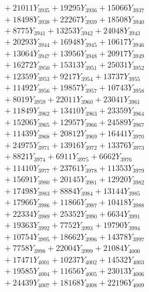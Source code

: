 \documentclass[a4paper,10pt]{article}
\begin{document}
{\begin{align}
&\;  + 21011 Y_{3935} + 19295 Y_{3936} + 15066 Y_{3937} \\[0.3ex]
&\;  + 18498 Y_{3938} + 22267 Y_{3939} + 18508 Y_{3940} \\[0.3ex]
&\;  + 8775 Y_{3941} + 13253 Y_{3942} + 24048 Y_{3943} \\[0.3ex]
&\;  + 20293 Y_{3944} + 16948 Y_{3945} + 10617 Y_{3946} \\[0.3ex]
&\;  + 13064 Y_{3947} + 13956 Y_{3948} + 20917 Y_{3949} \\[0.3ex]
&\;  + 16272 Y_{3950} + 15313 Y_{3951} + 25031 Y_{3952} \\[0.3ex]
&\;  + 12359 Y_{3953} + 9217 Y_{3954} + 13737 Y_{3955} \\[0.3ex]
&\;  + 11492 Y_{3956} + 19857 Y_{3957} + 10743 Y_{3958} \\[0.5ex]\allowbreak
&\;  + 8019 Y_{3959} + 22011 Y_{3960} + 23041 Y_{3961} \\[0.3ex]
&\;  + 11849 Y_{3962} + 13410 Y_{3963} + 23359 Y_{3964} \\[0.3ex]
&\;  + 15206 Y_{3965} + 12957 Y_{3966} + 24589 Y_{3967} \\[0.3ex]
&\;  + 11439 Y_{3968} + 20812 Y_{3969} + 16441 Y_{3970} \\[0.3ex]
&\;  + 24975 Y_{3971} + 13916 Y_{3972} + 13376 Y_{3973} \\[0.3ex]
&\;  + 8821 Y_{3974} + 6911 Y_{3975} + 6662 Y_{3976} \\[0.3ex]
&\;  + 11410 Y_{3977} + 23761 Y_{3978} + 11353 Y_{3979} \\[0.3ex]
&\;  + 15691 Y_{3980} + 20145 Y_{3981} + 12920 Y_{3982} \\[0.3ex]
&\;  + 17498 Y_{3983} + 8884 Y_{3984} + 13144 Y_{3985} \\[0.3ex]
&\;  + 17966 Y_{3986} + 11866 Y_{3987} + 10418 Y_{3988} \\[0.5ex]\allowbreak
&\;  + 22334 Y_{3989} + 25352 Y_{3990} + 6634 Y_{3991} \\[0.3ex]
&\;  + 19363 Y_{3992} + 7752 Y_{3993} + 19790 Y_{3994} \\[0.3ex]
&\;  + 10754 Y_{3995} + 18662 Y_{3996} + 14378 Y_{3997} \\[0.3ex]
&\;  + 7758 Y_{3998} + 22004 Y_{3999} + 21084 Y_{4000} \\[0.3ex]
&\;  + 17471 Y_{4001} + 10237 Y_{4002} + 14532 Y_{4003} \\[0.3ex]
&\;  + 19585 Y_{4004} + 11656 Y_{4005} + 23013 Y_{4006} \\[0.3ex]
&\;  + 24439 Y_{4007} + 18168 Y_{4008} + 22196 Y_{4009} \\[0.3ex]

\end{align}}
\end{document}
